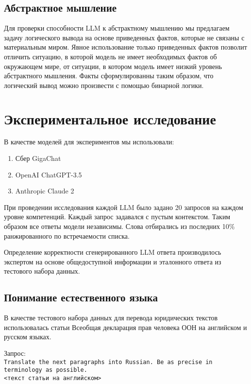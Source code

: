 \documentclass{article}
\begin{document}
\subsection*{Абстрактное мышление}
Для проверки способности LLM к абстрактному мышлению мы предлагаем задачу логического вывода на основе приведенных фактов, которые не связаны с материальным миром. Явное использование только приведенных фактов позволит отличить ситуацию, в которой модель не имеет необходимых фактов об окружающем мире, от ситуации, в котором модель имеет низкий уровень абстрактного мышления. Факты сформулированны таким образом, что логический вывод можно произвести с помощью бинарной логики.

\section{Экспериментальное исследование}
В качестве моделей для экспериментов мы использовали:
\begin{enumerate}

    \item Сбер GigaChat \cite{gigachat}
    \item OpenAI ChatGPT-3.5 \cite{chatgpt}
    \item Anthropic Claude 2 \cite{claude}
\end{enumerate}

При проведении исследования каждой LLM было задано 20 запросов на каждом уровне компетенций. Каждый запрос задавался с пустым контекстом. Таким образом все ответы модели независимы. Слова отбирались из последних 10\% ранжированного по встречаемости списка.

Определение корректности сгенерированного LLM ответа производилось экспертом на основе общедоступной информации и эталонного ответа из тестового набора данных.

\subsection*{Понимание естественного языка}
В качестве тестового набора данных для перевода юридических текстов использовалась статьи Всеобщая декларация прав человека ООН на английском \cite{declaration_eng} и русском \cite{declaration_rus} языках.

Запрос: \\
\texttt{Translate the next paragraphs into Russian. Be as precise in terminology as possible. \\
    <текст статьи на английском>}
\end{document}
